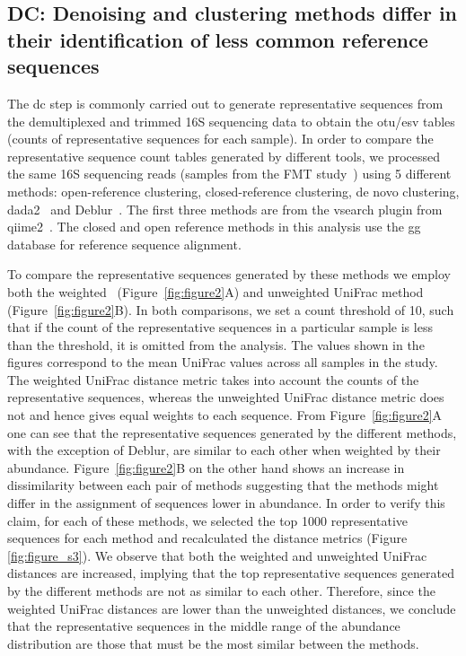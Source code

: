   \FloatBarrier

  \subsection*{DC: Denoising and clustering methods differ in their identification of less common reference sequences}

  The \ac{dc} step is commonly carried out to generate representative sequences from the demultiplexed and trimmed 16S sequencing data to obtain the \acs{otu}/\acs{esv} tables (counts of representative sequences for each sample).
  In order to compare the representative sequence count tables generated by different tools, we processed the same 16S sequencing reads (samples from the FMT study~\cite{Kang2017}) using 5 different methods: open-reference clustering, closed-reference clustering, de novo clustering, \ac{dada2}~\cite{Callahan2016} and Deblur~\cite{Amir2017}.
  The first three methods are from the vsearch plugin from \ac{qiime2}~\cite{bolyenReproducibleInteractiveScalable2019}.
  The closed and open reference methods in this analysis use the \ac{gg} database for reference sequence alignment.

  To compare the representative sequences generated by these methods we employ both the weighted~\cite{Lozupone2007} (Figure~\ref{fig:figure2}A) and unweighted UniFrac method~\cite{Lozupone2005} (Figure~\ref{fig:figure2}B).
  In both comparisons, we set a count threshold of 10, such that if the count of the representative sequences in a particular sample is less than the threshold, it is omitted from the analysis.
  The values shown in the figures correspond to the mean UniFrac values across all samples in the study.
  The weighted UniFrac distance metric takes into account the counts of the representative sequences, whereas the unweighted UniFrac distance metric does not and hence gives equal weights to each sequence.
  From Figure~\ref{fig:figure2}A one can see that the representative sequences generated by the different methods, with the exception of Deblur, are similar to each other when weighted by their abundance.
  Figure~\ref{fig:figure2}B on the other hand shows an increase in dissimilarity between each pair of methods suggesting that the methods might differ in the assignment of sequences lower in abundance.
  In order to verify this claim, for each of these methods, we selected the top 1000 representative sequences for each method and recalculated the distance metrics (Figure \ref{fig:figure_s3}).
  We observe that both the weighted and unweighted UniFrac distances are increased, implying that the top representative sequences generated by the different methods are not as similar to each other.
  Therefore, since the weighted UniFrac distances are lower than the unweighted distances, we conclude that the representative sequences in the middle range of the abundance distribution are those that must be the most similar between the methods.

